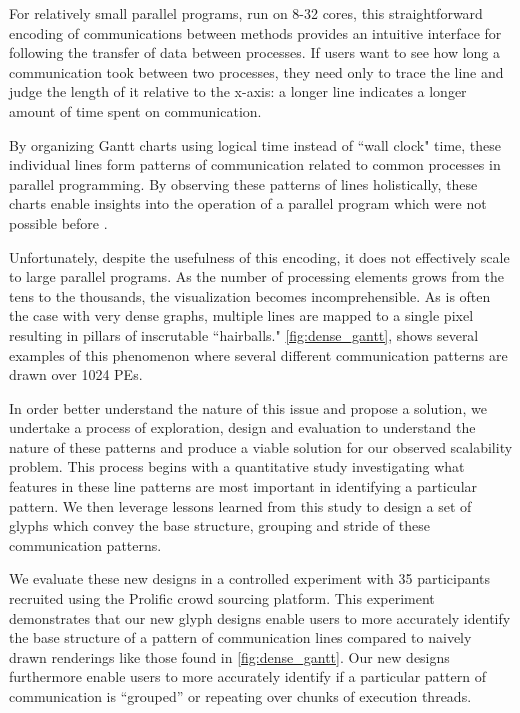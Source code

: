 For relatively small parallel programs, run on 8-32 cores, this straightforward encoding of communications between methods provides an intuitive interface for following the transfer of data between processes. If users want to see how long a communication took between two processes, they need only to trace the line and judge the length of it relative to the x-axis: a longer line indicates a longer amount of time spent on communication. 

By organizing Gantt charts using logical time instead of ``wall clock" time, these individual lines form patterns of communication related to common processes in parallel programming. By observing these patterns of lines holistically, these charts enable insights into the operation of a parallel program which were not possible before \cite{isaacs2014combing}. 

Unfortunately, despite the usefulness of this encoding, it does not effectively scale to large parallel programs. As the number of processing elements grows from the tens to the thousands, the visualization becomes incomprehensible. As is often the case with very dense graphs, multiple lines are mapped to a single pixel resulting in pillars of inscrutable ``hairballs." \autoref{fig:dense_gantt}, shows several examples of this phenomenon where several different communication patterns are drawn over 1024 PEs.

In order better understand the nature of this issue and propose a solution, we undertake a process of exploration, design and evaluation to understand the nature of these patterns and produce a viable solution for our observed scalability problem. This process begins with a quantitative study investigating what features in these line patterns are most important in identifying a particular pattern. We then leverage lessons learned from this study to design a set of glyphs which convey the base structure, grouping and stride of these communication patterns. 

We evaluate these new designs in a controlled experiment with 35 participants recruited using the Prolific crowd sourcing platform. This experiment demonstrates that our new glyph designs enable users to more accurately identify the base structure of a pattern of communication lines compared to naively drawn renderings like those found in \autoref{fig:dense_gantt}. Our new designs furthermore enable users to more accurately identify if a particular pattern of communication is “grouped” or repeating over chunks of execution threads. 